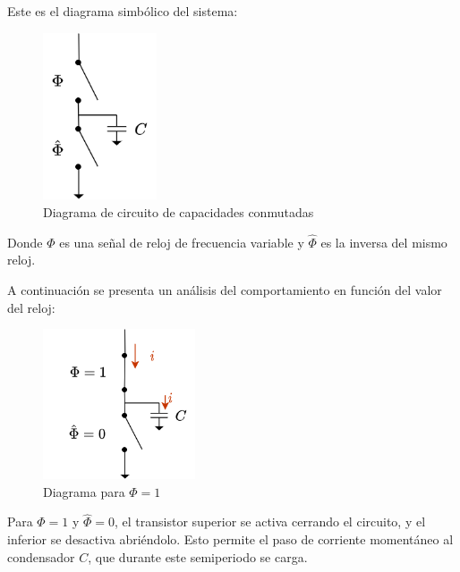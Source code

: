 \documentclass[12pt]{report} %
\begin{document}
	Este es el diagrama simbólico del sistema:
	
	\begin{figure}[H]
		\includegraphics[width=0.3\textwidth]{sw-capacities-symbol-1.png}
		\caption[Diagrama de circuito de capacidades conmutadas]{Diagrama de circuito de capacidades conmutadas}
		\label{fig:sw-capacities-symbol-1.png}
	\end{figure}

	Donde $\Phi$ es una señal de reloj de frecuencia variable y $\hat{\Phi}$ es la inversa del mismo reloj.
	
	A continuación se presenta un análisis del comportamiento en función del valor del reloj:
	
	\begin{figure}[H]
		\includegraphics[width=0.4\textwidth]{sw-capacities-symbol-2.png}
		\caption[Diagrama para $\Phi=1$]{Diagrama para $\Phi=1$}
		\label{fig:sw-capacities-symbol-2.png}
	\end{figure}
	Para $\Phi = 1$ y $\hat{\Phi} = 0$, el transistor superior se activa cerrando el circuito, y el inferior se desactiva abriéndolo. Esto permite el paso de corriente momentáneo al condensador $C$, que durante este semiperiodo se carga.
	
\end{document}
